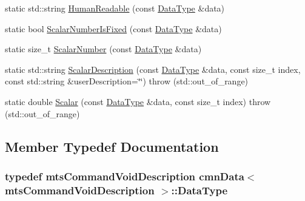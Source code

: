 \begin{DoxyCompactItemize}
\item 
static std\+::string \hyperlink{classcmn_data_3_01mts_command_void_description_01_4_a9b06cc3ee446dbbd56f9023eec0fa928}{Human\+Readable} (const \hyperlink{classcmn_data_3_01mts_command_void_description_01_4_a3e577a0f1b624d67c004609f2145eba4}{Data\+Type} \&data)
\item 
static bool \hyperlink{classcmn_data_3_01mts_command_void_description_01_4_a836696a65a1a970709c13815f45b9ea1}{Scalar\+Number\+Is\+Fixed} (const \hyperlink{classcmn_data_3_01mts_command_void_description_01_4_a3e577a0f1b624d67c004609f2145eba4}{Data\+Type} \&data)
\item 
static size\+\_\+t \hyperlink{classcmn_data_3_01mts_command_void_description_01_4_a214b1c237370c8bd701f9514fbbc0b03}{Scalar\+Number} (const \hyperlink{classcmn_data_3_01mts_command_void_description_01_4_a3e577a0f1b624d67c004609f2145eba4}{Data\+Type} \&data)
\item 
static std\+::string \hyperlink{classcmn_data_3_01mts_command_void_description_01_4_a834fc6421ec7514a6456d203599a2024}{Scalar\+Description} (const \hyperlink{classcmn_data_3_01mts_command_void_description_01_4_a3e577a0f1b624d67c004609f2145eba4}{Data\+Type} \&data, const size\+\_\+t index, const std\+::string \&user\+Description=\char`\"{}\char`\"{})  throw (std\+::out\+\_\+of\+\_\+range)
\item 
static double \hyperlink{classcmn_data_3_01mts_command_void_description_01_4_a6f82e68e00acb4a7f3afd2bf9214dd6f}{Scalar} (const \hyperlink{classcmn_data_3_01mts_command_void_description_01_4_a3e577a0f1b624d67c004609f2145eba4}{Data\+Type} \&data, const size\+\_\+t index)  throw (std\+::out\+\_\+of\+\_\+range)
\end{DoxyCompactItemize}


\subsection{Member Typedef Documentation}
\hypertarget{classcmn_data_3_01mts_command_void_description_01_4_a3e577a0f1b624d67c004609f2145eba4}{}
\subsubsection[{Data\+Type}]{\setlength{\rightskip}{0pt plus 5cm}typedef {\bf mts\+Command\+Void\+Description} {\bf cmn\+Data}$<$ {\bf mts\+Command\+Void\+Description} $>$\+::{\bf Data\+Type}}\label{classcmn_data_3_01mts_command_void_description_01_4_a3e577a0f1b624d67c004609f2145eba4}


